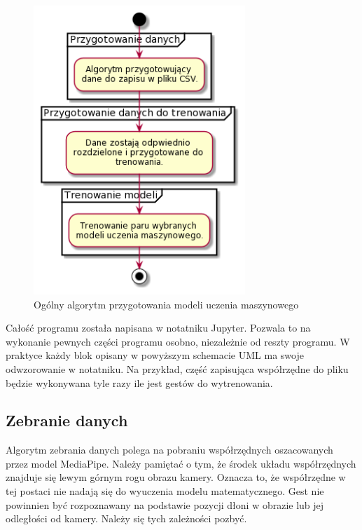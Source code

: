 \begin{figure}[H]
    \begin{center}
        \includegraphics[width=8cm]{../images/full_algorithm.png}
        \caption{Ogólny algorytm przygotowania modeli uczenia maszynowego}
    \end{center}
\end{figure}

\quad Całość programu została napisana w notatniku Jupyter. Pozwala to na wykonanie pewnych części programu osobno, niezależnie od reszty programu. W praktyce każdy blok opisany w powyższym schemacie UML ma swoje odwzorowanie w notatniku. Na przykład, część zapisująca współrzędne do pliku będzie wykonywana tyle razy ile jest gestów do wytrenowania. 

\subsection{Zebranie danych}
\quad Algorytm zebrania danych polega na pobraniu współrzędnych oszacowanych przez model MediaPipe. Należy pamiętać o tym, że środek układu współrzędnych znajduje się lewym górnym rogu obrazu kamery. Oznacza to, że współrzędne w tej postaci nie nadają się do wyuczenia modelu matematycznego. Gest nie powinnien być rozpoznawany na podstawie pozycji dłoni w obrazie lub jej odległości od kamery. Należy się tych zależności pozbyć. 

